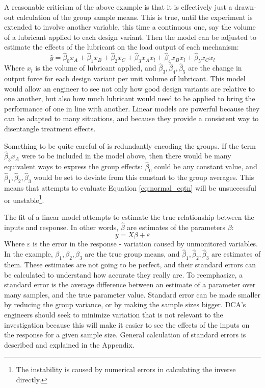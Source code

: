 \documentclass[11pt,a4paper,article]{memoir} %
\begin{document}
A reasonable criticism of the above example is that it is effectively just a drawn-out calculation of the group sample means. This is true, until the experiment is extended to involve another variable, this time a continuous one, say the volume of a lubricant applied to each design variant. Then the model can be adjusted to estimate the effects of the lubricant on the load output of each mechanism:
\begin{equation}
	\hat{y} = \hat{\beta}_0 x_A + \hat{\beta}_{1}x_B + \hat{\beta}_{2}x_C + \hat{\beta}_3 x_A x_l + \hat{\beta}_4 x_B x_l + \hat{\beta}_5 x_C x_l
\end{equation}
Where $x_l$ is the volume of lubricant applied, and $\hat{\beta}_3, \hat{\beta}_4, \hat{\beta}_5$ are the change in output force for each design variant per unit volume of lubricant. This model would allow an engineer to see not only how good design variants are relative to one another, but also how much lubricant would need to be applied to bring the performance of one in line with another. Linear models are powerful because they can be adapted to many situations, and because they provide a consistent way to disentangle treatment effects.

 Something to be quite careful of is redundantly encoding the groups. If the term $\hat{\beta}_3 x_A$ were to be included in the model above, then there would be many equivalent ways to express the group effects: $\hat{\beta}_0$ could be any constant value, and $\hat{\beta}_1, \hat{\beta}_2, \hat{\beta}_3$ would be set to deviate from this constant to the group averages. This means that attempts to evaluate Equation \ref{eq:normal_eqtn} will be unsuccessful or unstable\footnote{The instability is caused by numerical errors in calculating the inverse directly.}.

The fit of a linear model attempts to estimate the true relationship between the inputs and response. In other words, $\hat{\beta}$ are estimates of the parameters $\beta$:
\begin{equation}
	y = X\beta + \varepsilon
\end{equation}
Where $\varepsilon$ is the error in the response - variation caused by unmonitored variables. In the example, $\beta_1, \beta_2, \beta_3$ are the true group means, and $\hat{\beta}_1, \hat{\beta}_2, \hat{\beta}_3$ are estimates of them. These estimates are not going to be perfect, and their standard errors can be calculated to understand how accurate they really are. To reemphasize, a standard error is the average difference between an estimate of a parameter over many samples, and the true parameter value. Standard error can be made smaller by reducing the group variance, or by making the sample sizes bigger.  DCA's engineers should seek to minimize variation that is not relevant to the investigation because this will make it easier to see the effects of the inputs on the response for a given sample size. General calculation of standard errors is described and explained in the Appendix.
\end{document}
